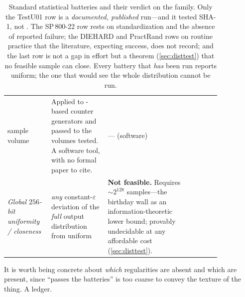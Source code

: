 \begin{table}[H]
\begin{tabular}{@{}p{0.15\linewidth} p{0.235\linewidth}
                     p{0.35\linewidth} p{0.115\linewidth}@{}}
    sample volume &
    Applied to \SHA{}-based counter generators and passed to the volumes
    tested. A software tool, with no formal paper to cite. &
    --- (software) \\
    \addlinespace[1pt]
    \emph{Global $256$-bit uniformity / closeness} &
    \emph{any} constant-$\varepsilon$ deviation of the \emph{full} output
    distribution from uniform &
    \textbf{Not feasible.} Requires ${\sim}2^{128}$ samples---the
    birthday wall as an information-theoretic lower bound; provably
    undecidable at any affordable cost (\cref{sec:disttest}). &
    \citet{Canonne2020} \\
    \bottomrule
  \end{tabular}
  \caption{Standard statistical batteries and their verdict on the
  \SHA{} family. Only the TestU01 row is a \emph{documented, published}
  run---and it tested SHA-1, not \SHA{}. The SP\,800-22 row rests on
  standardization and the absence of reported failure; the DIEHARD and
  PractRand rows on routine practice that the literature, expecting
  success, does not record; and the last row is not a gap in effort but
  a theorem (\cref{sec:disttest}) that no feasible sample can close.
  Every battery that \emph{has} been run reports uniform; the one that
  would see the whole distribution cannot be run.}
  \label{tab:batteries}
\end{table}

It is worth being concrete about \emph{which} regularities are absent
and which are present, since ``passes the batteries'' is too coarse to
convey the texture of the thing. A ledger.

